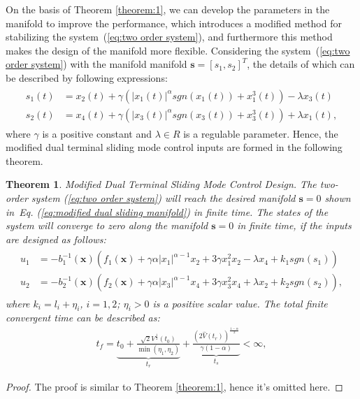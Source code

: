 \documentclass[3p]{elsarticle}
\theoremstyle{plain}
\newtheorem{mythm}{Theorem}
\theoremstyle{remark}
\begin{document}
On the basis of Theorem \ref{theorem:1}, we can develop the parameters in the manifold to improve the performance, which introduces a modified method for stabilizing the system~(\ref{eq:two order system}), and furthermore this method makes the design of the manifold more flexible. Considering the system~(\ref{eq:two order system}) with the manifold manifold $\bm s = [s_1,s_2]^T$, the details of which can be described by following expressions:
\begin{align}
\begin{split}
s_1(t) &= x_2(t)+\gamma(\vert x_1(t)\vert^{\alpha} sgn(x_1(t))+x_1^3(t))-\lambda x_3(t)\\
s_2(t) &= x_4(t)+\gamma(\vert x_3(t)\vert^{\alpha} sgn(x_3(t))+x_3^3(t))+\lambda x_1(t),\label{eq:modified dual sliding manifold}
\end{split}
\end{align}
where $\gamma$ is a positive constant and $\lambda\in R$ is a regulable parameter. Hence, the modified dual terminal sliding mode control inputs are formed in the following theorem.
\begin{mythm}\label{theorem:2}Modified Dual Terminal Sliding Mode Control Design.
The two-order system (\ref{eq:two order system}) will reach the desired manifold $\bm s = 0$ shown in~Eq. (\ref{eq:modified dual sliding manifold}) in finite time. The states of the system will converge to zero along the manifold $\bm s=0$ in finite time, if the inputs are designed as follows:
\begin{align}
\begin{split}
u_1 &= -b_1^{-1}(\bm x)(f_1(\bm x)+\gamma\alpha\vert x_1\vert^{\alpha-1}x_2+3\gamma x_1^2x_2-\lambda x_4+k_1sgn(s_1))\\
u_2 &= -b_2^{-1}(\bm x)(f_2(\bm x)+\gamma\alpha\vert x_3\vert^{\alpha-1}x_4+3\gamma x_3^2x_4+\lambda x_2+k_2sgn(s_2)),\label{eq:modified input}
\end{split}
\end{align}
where $k_i = l_i+\eta_i$, $i=1,2$; $\eta_i>0$ is a positive scalar value. The total finite convergent time can be described as:
\begin{align}
t_f = \underbrace{t_0+\frac{\sqrt{2}V^{\frac{1}{2}}(t_0)}{\min(\eta_1,\eta_2)}}_{t_r}+\underbrace{\frac{(2\hat V(t_r))^{\frac{1-\alpha}{2}}}{\gamma(1-\alpha)}}_{t_s}<\infty,\label{eq:total convergent time}
\end{align}
\end{mythm}
\begin{proof}
The proof is similar to Theorem \ref{theorem:1}, hence it's omitted here.
\end{proof}
\end{document}
